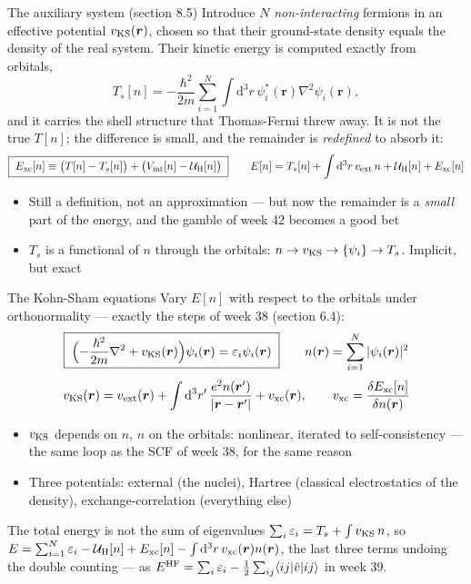 \documentclass[aspectratio=169,10pt]{beamer}
\newcommand{\element}[3]{\langle #1\vert #2\vert #3\rangle}
\newcommand{\dd}{\mathrm{d}}
\begin{document}
\begin{frame}{The auxiliary system (section 8.5)}
  Introduce $N$ \emph{non-interacting} fermions in an effective potential $v_{\rm KS}(\bm r)$, chosen so that their ground-state density \alert{equals the density of the real system}. Their kinetic energy is computed exactly from orbitals,
  \[
    T_s[n]=-\frac{\hbar^2}{2m}\sum_{i=1}^N\int\dd^3r\,\psi_i^{*}(\bm r)\nabla^2\psi_i(\bm r),
  \]
  and it carries the shell structure that Thomas-Fermi threw away. It is not the true $T[n]$; the difference is small, and the remainder is \emph{redefined} to absorb it:
  \[
    \boxed{\;E_{\rm xc}[n]\equiv\bigl(T[n]-T_s[n]\bigr)+\bigl(V_{\rm int}[n]-\mathcal U_{\rm H}[n]\bigr)\;}
    \qquad
    E[n]=T_s[n]+\int\dd^3r\,v_{\rm ext}\,n+\mathcal U_{\rm H}[n]+E_{\rm xc}[n]
  \]
  \begin{itemize}
    \item Still a definition, not an approximation --- but now the remainder is a \emph{small} part of the energy, and the gamble of week 42 becomes a good bet
    \item $T_s$ is a functional of $n$ through the orbitals: $n\to v_{\rm KS}\to\{\psi_i\}\to T_s$. Implicit, but exact
  \end{itemize}
\end{frame}

\begin{frame}[shrink=5]{The Kohn-Sham equations}
  \small
  Vary $E[n]$ with respect to the orbitals under orthonormality --- exactly the steps of week 38 (section 6.4):
  \[
    \boxed{\;\Bigl(-\frac{\hbar^2}{2m}\nabla^2+v_{\rm KS}(\bm r)\Bigr)\psi_i(\bm r)=\varepsilon_i\psi_i(\bm r)\;}
    \qquad
    n(\bm r)=\sum_{i=1}^N|\psi_i(\bm r)|^2
  \]
  \vspace{-0.8em}
  \[
    v_{\rm KS}(\bm r)=v_{\rm ext}(\bm r)+\int\dd^3r'\,\frac{e^2n(\bm r')}{|\bm r-\bm r'|}+v_{\rm xc}(\bm r),
    \qquad
    v_{\rm xc}=\frac{\delta E_{\rm xc}[n]}{\delta n(\bm r)}
  \]
  \begin{itemize}
    \item $v_{\rm KS}$ depends on $n$, $n$ on the orbitals: nonlinear, iterated to self-consistency --- \alert{the same loop as the SCF of week 38, for the same reason}
    \item Three potentials: external (the nuclei), Hartree (classical electrostatics of the density), exchange-correlation (everything else)
  \end{itemize}
  \begin{block}{The total energy is not the sum of eigenvalues}
    $\sum_i\varepsilon_i=T_s+\int v_{\rm KS}\,n$, so
    $E=\sum_{i=1}^N\varepsilon_i-\mathcal U_{\rm H}[n]+E_{\rm xc}[n]-\int\dd^3r\,v_{\rm xc}(\bm r)n(\bm r)$,
    the last three terms undoing the double counting --- as $E^{\rm HF}=\sum_i\varepsilon_i-\frac12\sum_{ij}\element{ij}{\hat v}{ij}$ in week 39.
  \end{block}
\end{frame}
\end{document}
